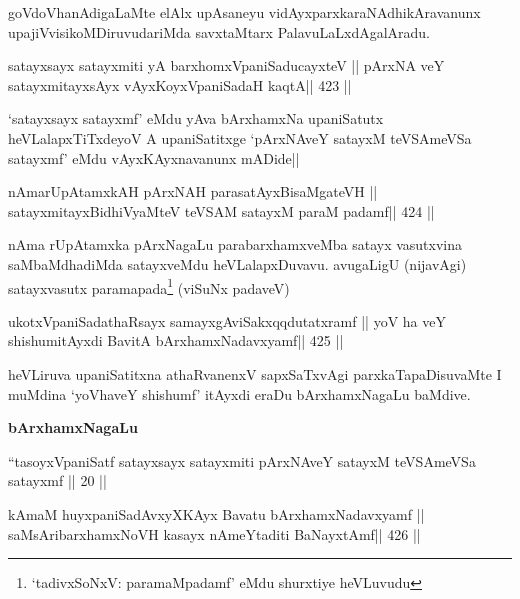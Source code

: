 \begin{artha}
goVdoVhanAdigaLaMte elAlx upAsaneyu vidAyxparxkaraNAdhikAravanunx
upajiVvisikoMDiruvudariMda savxtaMtarx PalavuLaLxdAgalAradu.
\end{artha}




\begin{shl}
satayxsayx satayxmiti yA barxhomxVpaniSaducayxteV ||
pArxNA veY satayxmitayxsAyx vAyxKoyxVpaniSadaH kaqtA\hfill || 423 ||
\end{shl}

\begin{artha}
`satayxsayx satayxmf' eMdu yAva bArxhamxNa upaniSatutx
  heVLalapxTiTxdeyoV A upaniSatitxge `pArxNAveY satayxM teVSAmeVSa
  satayxmf' eMdu vAyxKAyxnavanunx mADide||
\end{artha}

\begin{shl}
nAmarUpAtamxkAH pArxNAH parasatAyxBisaMgateVH ||
satayxmitayxBidhiVyaMteV teVSAM satayxM paraM padamf\hfill || 424 ||
\end{shl}

\begin{artha}
nAma rUpAtamxka pArxNagaLu parabarxhamxveMba satayx vasutxvina
saMbaMdhadiMda satayxveMdu heVLalapxDuvavu. avugaLigU (nijavAgi)
satayxvasutx paramapada\footnote[1]{`tadivxSoNxV: paramaMpadamf' 
eMdu shurxtiye heVLuvudu} (viSuNx padaveV) 
\end{artha}

\begin{shl}
ukotxVpaniSadathaRsayx samayxgAviSakxqqdutatxramf ||
yoV ha veY shishumitAyxdi BavitA bArxhamxNadavxyamf\hfill || 425 ||
\end{shl}

\begin{artha}
heVLiruva upaniSatitxna athaRvanenxV sapxSaTxvAgi parxkaTapaDisuvaMte
I muMdina `yoVhaveY shishumf' itAyxdi eraDu bArxhamxNagaLu baMdive.
\end{artha}


\medskip
\centerline{\textbf{bArxhamxNagaLu}}

``tasoyxVpaniSatf satayxsayx satayxmiti pArxNAveY satayxM teVSAmeVSa
satayxmf || 20 ||


\medskip



\begin{shl}
kAmaM huyxpaniSadAvxyXKAyx Bavatu bArxhamxNadavxyamf ||
saMsAribarxhamxNoVH kasayx nAmeYtaditi BaNayxtAmf\hfill || 426 ||
\end{shl}

